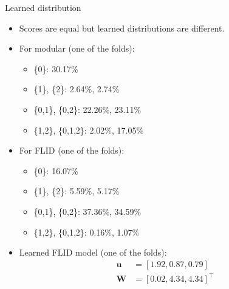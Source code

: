 \documentclass{beamer}
\begin{document}
\begin{frame}{Learned distribution}
  \begin{itemize}
    \item Scores are equal but learned distributions are different.
    \item For modular (one of the folds):
      \begin{itemize}
        \item \{0\}: 30.17\%
        \item \{1\}, \{2\}: 2.64\%, 2.74\%
        \item \{0,1\}, \{0,2\}: 22.26\%, 23.11\%
        \item \{1,2\}, \{0,1,2\}: 2.02\%, 17.05\%
      \end{itemize}
    \item For FLID (one of the folds):
      \begin{itemize}
        \item \{0\}: 16.07\%
        \item \{1\}, \{2\}: 5.59\%, 5.17\%
        \item \{0,1\}, \{0,2\}: 37.36\%, 34.59\%
        \item \{1,2\}, \{0,1,2\}: 0.16\%, 1.07\%
      \end{itemize}
    \item Learned FLID model (one of the folds):
      \begin{align*}
        \mathbf{u} &= [1.92, 0.87, 0.79] \\
        \mathbf{W} &= [0.02, 4.34, 4.34]^\intercal
      \end{align*}
  \end{itemize}
\end{frame}
\end{document}
